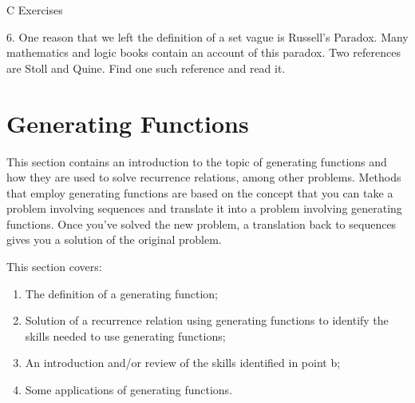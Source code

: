 \documentclass[10pt,]{book}
\theoremstyle{plain}
\theoremstyle{definition}
\theoremstyle{definition}
\theoremstyle{definition}
\theoremstyle{definition}
\numberwithin{equation}{section}
\begin{document}
\par\smallskip\noindent
\hypertarget{exercisegroup-2}{}\typeout{************************************************}
\typeout{************************************************}
C Exercises%
\begin{exercisegroup}
\item[6.]\hypertarget{exercise-6}{} One reason that we left the definition of a set vague is Russell's Paradox. Many mathematics and logic books contain an account of this paradox. Two references are Stoll and Quine. Find one such reference and read it.  %
\par\smallskip
\end{exercisegroup}
\par\smallskip\noindent
\typeout{************************************************}
\typeout{************************************************}
\section[Generating Functions]{Generating Functions}\label{s-generating-functions}
\typeout{************************************************}
\typeout{************************************************}
This section contains an introduction to the topic of generating functions and how they are used to solve recurrence relations, among other problems.
Methods that employ generating functions are based on the concept that you can take a problem involving sequences and translate it into a problem
involving generating functions. Once you've solved the new problem, a translation back to sequences gives you a solution of the original problem.%
\par
This section covers:%
\par
\leavevmode%
\begin{enumerate}[label=\arabic*]
\item\hypertarget{li-58}{}The definition of a generating function;%
\item\hypertarget{li-59}{}Solution of a recurrence relation using generating functions to identify the skills needed to use generating functions;\\%
\item\hypertarget{li-60}{}An introduction and/or review of the skills identified in point b;\\%
\item\hypertarget{li-61}{}Some applications of generating functions.%
\end{enumerate}
%
\typeout{************************************************}
\typeout{************************************************}
\end{document}
